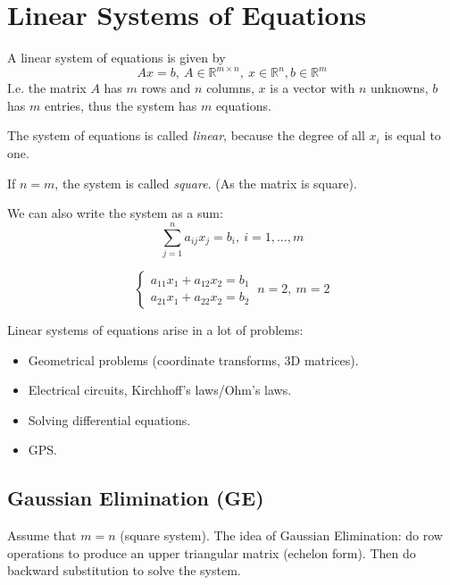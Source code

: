 \pagebreak
\section{Linear Systems of Equations}
\begin{definition}
    A linear system of equations is given by
    \[ 
        Ax = b,\ A \in \mathbb{R}^{m \times n},\ x \in \mathbb{R}^n,
        b \in \mathbb{R}^m
    \]
    I.e. the matrix $A$ has $m$ rows and $n$ columns, $x$ is a vector with
    $n$ unknowns, $b$ has $m$ entries, thus the system has
    $m$ equations.
\end{definition}
\begin{remark}
    The system of equations is called \textit{linear}, because 
    the degree of all $x_i$ is equal to one.
\end{remark}
\begin{remark}
    If $n = m$, the system is called \textit{square}. (As the matrix is square).
\end{remark}
\begin{remark}
    We can also write the system as a sum:
    \[
        \sum_{j=1}^n a_{ij} x_j = b_i,\ i = 1, \dots, m
    \]
\end{remark}

\begin{example}
    \[
        \begin{cases}
            a_{11} x_1 + a_{12} x_2 = b_1\\
            a_{21} x_1 + a_{22} x_2 = b_2
        \end{cases}\
        n = 2,\ m = 2
    \]
\end{example}

Linear systems of equations arise in a lot of problems:
\begin{itemize}
    \item {
        Geometrical problems (coordinate transforms, 3D matrices).
    }
    \item {
        Electrical circuits, Kirchhoff's laws/Ohm's laws.
    }
    \item {
        Solving differential equations.
    }
    \item {
        GPS.
    }
\end{itemize}

\subsection{Gaussian Elimination (GE)}
Assume that $m = n$ (square system).
The idea of Gaussian Elimination: do row operations to produce an 
upper triangular matrix (echelon form). Then do backward substitution
to solve the system.

